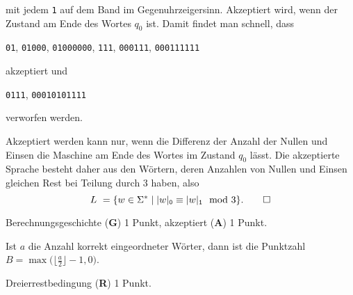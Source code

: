 \begin{loesung}
\begin{teilaufgaben}
mit jedem \texttt{1} auf dem Band im Gegenuhrzeigersinn.
Akzeptiert wird, wenn der Zustand am Ende des Wortes $q_0$ ist.
Damit findet man schnell, dass
\begin{center}
\texttt{01},
\texttt{01000},
\texttt{01000000},
\texttt{111},
\texttt{000111},
\texttt{000111111}
\end{center}
akzeptiert und
\begin{center}
\texttt{0111},
\texttt{00010101111}
\end{center}
verworfen werden.
\item
Akzeptiert werden kann nur, wenn die Differenz der Anzahl der Nullen und
Einsen die Maschine am Ende des Wortes im Zustand $q_0$ lässt.
Die akzeptierte Sprache besteht daher aus den Wörtern, deren Anzahlen
von Nullen und Einsen gleichen Rest bei Teilung durch 3 haben,
also
\[
L = \{
w\in\Sigma^*
\mid
|w|_{\texttt{0}} \equiv |w|_{\texttt{1}} \mod 3
\}.
\qedhere
\]
\end{teilaufgaben}
\end{loesung}

\begin{bewertung}
\begin{teilaufgaben}
\item 
Berechnungsgeschichte ({\bf G}) 1 Punkt,
akzeptiert ({\bf A}) 1 Punkt.
\item
Ist $a$ die Anzahl korrekt eingeordneter Wörter, dann ist die Punktzahl
$B=\max\bigl(\lfloor \frac{a}2\rfloor-1,0\bigr)$.
\item
Dreierrestbedingung ({\bf R}) 1 Punkt.
\end{teilaufgaben}
\end{bewertung}

